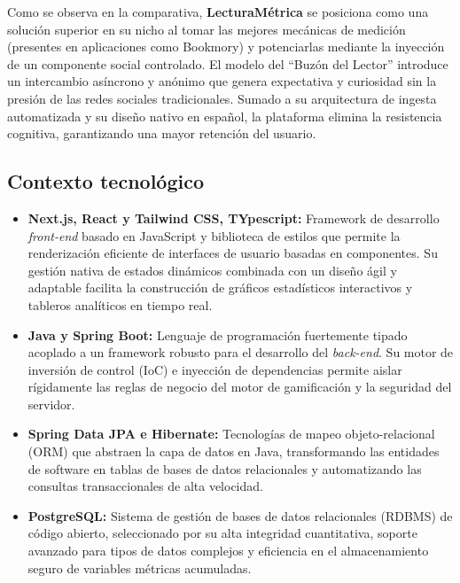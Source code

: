 \documentclass[12pt, atypical, journal]{article}
\begin{document}
Como se observa en la comparativa, \textbf{LecturaMétrica} se posiciona como una solución superior en su nicho al tomar las mejores mecánicas de medición (presentes en aplicaciones como Bookmory) y potenciarlas mediante la inyección de un componente social controlado. El modelo del ``Buzón del Lector'' introduce un intercambio asíncrono y anónimo que genera expectativa y curiosidad sin la presión de las redes sociales tradicionales. Sumado a su arquitectura de ingesta automatizada y su diseño nativo en español, la plataforma elimina la resistencia cognitiva, garantizando una mayor retención del usuario.

\subsection{Contexto tecnológico}
\begin{itemize}
   \item \textbf{Next.js, React y Tailwind CSS, TYpescript:} Framework de desarrollo \textit{front-end} basado en JavaScript y biblioteca de estilos que permite la renderización eficiente de interfaces de usuario basadas en componentes. Su gestión nativa de estados dinámicos combinada con un diseño ágil y adaptable facilita la construcción de gráficos estadísticos interactivos y tableros analíticos en tiempo real.
   \item \textbf{Java y Spring Boot:} Lenguaje de programación fuertemente tipado acoplado a un framework robusto para el desarrollo del \textit{back-end}. Su motor de inversión de control (IoC) e inyección de dependencias permite aislar rígidamente las reglas de negocio del motor de gamificación y la seguridad del servidor.
   \item \textbf{Spring Data JPA e Hibernate:} Tecnologías de mapeo objeto-relacional (ORM) que abstraen la capa de datos en Java, transformando las entidades de software en tablas de bases de datos relacionales y automatizando las consultas transaccionales de alta velocidad.
   \item \textbf{PostgreSQL:} Sistema de gestión de bases de datos relacionales (RDBMS) de código abierto, seleccionado por su alta integridad cuantitativa, soporte avanzado para tipos de datos complejos y eficiencia en el almacenamiento seguro de variables métricas acumuladas.
\end{itemize}

\newpage

\end{document}
